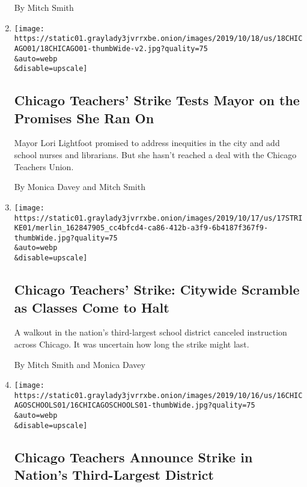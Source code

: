 \begin{enumerate}
  By Mitch Smith
\item
  \href{/2019/10/18/us/chicago-teacher-strike-lightfoot.html}{}

  \texttt{[image: https://static01.graylady3jvrrxbe.onion/images/2019/10/18/us/18CHICAGO01/18CHICAGO01-thumbWide-v2.jpg?quality=75\\\&auto=webp\\\&disable=upscale]}

  \hypertarget{chicago-teachers-strike-tests-mayor-on-the-promises-she-ran-on}{%
  \subsection{Chicago Teachers' Strike Tests Mayor on the Promises She
  Ran
  On}\label{chicago-teachers-strike-tests-mayor-on-the-promises-she-ran-on}}

  Mayor Lori Lightfoot promised to address inequities in the city and
  add school nurses and librarians. But she hasn't reached a deal with
  the Chicago Teachers Union.

  By Monica Davey and Mitch Smith
\item
  \href{/2019/10/17/us/chicago-schools-strike.html}{}

  \texttt{[image: https://static01.graylady3jvrrxbe.onion/images/2019/10/17/us/17STRIKE01/merlin\_162847905\_cc4bfcd4-ca86-412b-a3f9-6b4187f367f9-thumbWide.jpg?quality=75\\\&auto=webp\\\&disable=upscale]}

  \hypertarget{chicago-teachers-strike-citywide-scramble-as-classes-come-to-halt}{%
  \subsection{Chicago Teachers' Strike: Citywide Scramble as Classes
  Come to
  Halt}\label{chicago-teachers-strike-citywide-scramble-as-classes-come-to-halt}}

  A walkout in the nation's third-largest school district canceled
  instruction across Chicago. It was uncertain how long the strike might
  last.

  By Mitch Smith and Monica Davey
\item
  \href{/2019/10/16/us/chicago-schools-teachers-strike.html}{}

  \texttt{[image: https://static01.graylady3jvrrxbe.onion/images/2019/10/16/us/16CHICAGOSCHOOLS01/16CHICAGOSCHOOLS01-thumbWide.jpg?quality=75\\\&auto=webp\\\&disable=upscale]}

  \hypertarget{chicago-teachers-announce-strike-in-nations-third-largest-district}{%
  \subsection{Chicago Teachers Announce Strike in Nation's Third-Largest
  District}\label{chicago-teachers-announce-strike-in-nations-third-largest-district}}


\end{enumerate}
